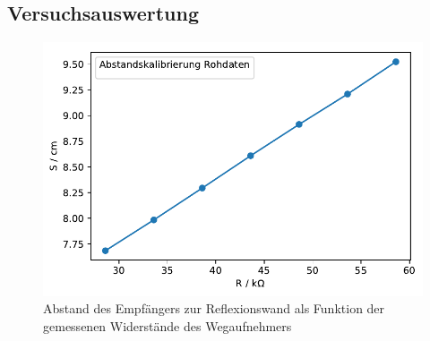 \documentclass[12pt,a4paper]{article}
\begin{document}
\subsection{Versuchsauswertung}

\begin{figure}[]
\centering
\includegraphics[scale=1]{Bilder/Abstandskal_Rohdaten.pdf}
\caption{Abstand des Empfängers zur Reflexionswand als Funktion der gemessenen Widerstände des Wegaufnehmers}
\label{Abstandskal_Rohdaten}
\end{figure}
\end{document}
